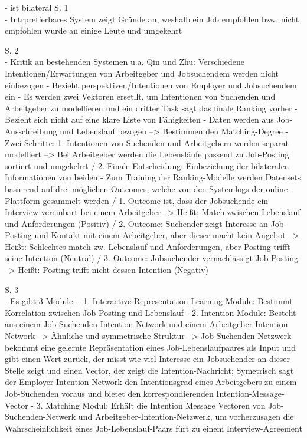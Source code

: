 \newpage
\textcite{le:2019}
- ist bilateral
S. 1\\
- Intrpretierbares System zeigt Gründe an, weshalb ein Job empfohlen bzw. nicht empfohlen wurde an einige Leute und umgekehrt

S. 2\\
- Kritik an bestehenden Systemen u.a. Qin und Zhu: Verschiedene Intentionen/Erwartungen von Arbeitgeber und Jobsuchendem werden nicht einbezogen
- Bezieht perspektiven/Intentionen von Employer und Jobsuchendem ein
- Es werden zwei Vektoren ersetllt, um Intentionen von Suchenden und Arbeitgeber zu modellieren und ein dritter Task sagt das finale Ranking vorher
- Bezieht sich nicht auf eine klare Liste von Fähigkeiten
- Daten werden aus Job-Ausschreibung und Lebenslauf bezogen --> Bestimmen den Matching-Degree
- Zwei Schritte: 1. Intentionen von Suchenden und Arbeitgebern werden separat modelliert --> Bei Arbeitgeber werden die Lebensläufe passend zu Job-Posting sortiert und umgekehrt / 2. Finale Entscheidung: Einbeziehung der bilateralen Informationen von beiden
- Zum Training der Ranking-Modelle werden Datensets basierend auf drei möglichen Outcomes, welche von den Systemlogs der online-Plattform gesammelt werden / 1. Outcome ist, dass der Jobsuchende ein Interview vereinbart bei einem Arbeitgeber --> Heißt: Match zwischen Lebenslauf und Anforderungen (Positiv) / 2. Outcome: Suchender zeigt Interesse an Job-Posting und Kontakt mit einem Arbeitgeber, aber dieser macht kein Angebot --> Heißt: Schlechtes match zw. Lebenslauf und Anforderungen, aber Posting trifft seine Intention (Neutral) / 3. Outcome: Jobsuchender vernachlässigt Job-Posting --> Heißt: Posting trifft nicht dessen Intention (Negativ)

S. 3\\
- Es gibt 3 Module:
- 1. Interactive Representation Learning Module: Bestimmt Korrelation zwischen Job-Posting und Lebenslauf
- 2. Intention Module: Besteht aus einem Job-Suchenden Intention Network und einem Arbeitgeber Intention Network --> Ähnliche und symmetrische Struktur --> Job-Suchenden-Netzwerk bekommt eine gelernte Repräsentation eines Job-Lebenslaufpaares als Input und gibt einen Wert zurück, der misst wie viel Interesse ein Jobsuchender an dieser Stelle zeigt und einen Vector, der zeigt die Intention-Nachricht; Symetrisch sagt der Employer Intention Network den Intentionsgrad eines Arbeitgebers zu einem Job-Suchenden voraus und bietet den korrespondierenden Intention-Message-Vector
- 3. Matching Modul: Erhält die Intention Message Vectoren von Job-Suchenden-Netwerk und Arbeitgeber-Intention-Netzwerk, um vorherzusagen die Wahrscheinlichkeit eines Job-Lebenslauf-Paars fürt zu einem Interview-Agreement

